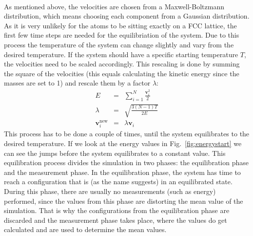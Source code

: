 \documentclass[12pt]{article}
\begin{document}
\\As mentioned above, the velocities are chosen from a Maxwell-Boltzmann distribution, which means choosing each component from a Gaussian
distribution. As it is very unlikely for the atoms to be sitting exactly on a FCC lattice, the first few time steps are needed for the equilibriation
of the system. Due to this process the temperature of the system can change slightly and vary from the desired temperature. 
If the system should have a
specific starting temperature $T$, the velocities need to be scaled accordingly. This rescaling is done by summing the square of the velocities
(this equals calculating the kinetic energy since the masses are set to 1) and rescale them by a factor $\lambda$:
\begin{eqnarray}
\label{eq:rescale1}   E &=& \sum_{i=1}^N \frac{\mathbf{v}_i^2}{2} \\
 \label{eq:rescale2}   \lambda &=& \sqrt{\frac{3(N-1)T}{2E}} \\
 \label{eq:rescale3}   \mathbf{v}_i^\text{new} &=& \lambda \mathbf{v}_i  
\end{eqnarray}
This process has to be done a couple of times, until the system equilibrates to the desired temperature. 
If we look at the energy values in Fig.~\ref{fig:energystart} we can see the
jumps before the system equilibrates to a constant value. This equilibration process divides the simulation in two phases: the equilibration
phase and the measurement phase. In the equilibration phase, the system has time to reach a configuration that is (as the name suggests) in an 
equilibrated state. During this phase, there are usually no measurements (such as energy) performed, since the values from this phase are distorting
the mean value of the simulation. That is why the configurations from the equilibration phase are discarded and the measurement phase takes place, 
where the values do get calculated and are used to determine the mean values.  
\end{document}
